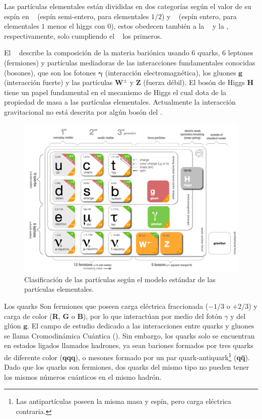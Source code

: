 Las partículas elementales están divididas en dos categorías según el valor de su espín en \fermiones ~ (espín semi-entero, para elementales $1/2$) y \bosones ~ (espín entero, para elementales $1$ menos el higgs con $0$), estos obedecen también a la \fermidirac ~ y la \boseeinstein, respectivamente, solo cumpliendo el \pauli ~ los primeros.

El \ME ~ describe la composición de la materia bariónica usando 6 quarks, 6 leptones (fermiones) y partículas mediadoras de las interacciones fundamentales conocidas (bosones), que son los fotones $\mathbf{\gamma}$ (interacción electromagnética), los gluones $\mathbf{g}$ (interacción fuerte) y las partículas $\mathbf{W}^\pm$ y $\mathbf{Z}$ (fuerza débil). 
El bosón de Higgs $\mathbf{H}$ tiene un papel fundamental en el mecanismo de Higgs el cual dota de la propiedad de masa a las partículas elementales. Actualmente la interacción gravitacional no está descrita por algún bosón del \ME.

\begin{figure}[!b]
    \centering
    \includegraphics[width=.8\textwidth]{Fisica_de_Particulas/imagenes/standard_model.png}
    \caption{Clasificación de las partículas según el modelo estándar de las partículas elementales.}
    \label{estandar}
\end{figure}


Los quarks Son fermiones que poseen carga eléctrica fraccionada ($- 1/3$ o $+ 2/3$) y carga de color (\textbf{R}, \textbf{G} o \textbf{B}), por lo que interactúan por medio del fotón $\gamma$ y del glúon $\mathbf{g}$. El campo de estudio dedicado a las interacciones entre quarks y gluones se llama Cromodinámica Cuántica (\QCD). Sin embargo, los quarks solo se encuentran en estados ligados llamados hadrones, ya sean bariones formados por tres quarks de diferente color (\textbf{qqq}), o mesones formado por un par quark-antiquark\footnote{Las antipartículas poseen la misma masa y espín, pero carga eléctrica contraria.} (\textbf{q\={q}}). Dado que los quarks son fermiones, dos quarks del mismo tipo no pueden tener los mismos n\'umeros cuánticos en el mismo hadrón.

